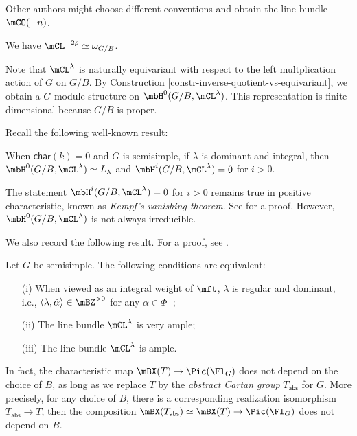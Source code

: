 	\begin{warn}
		Other authors might choose different conventions and obtain the line bundle $\mCO(-n)$.
	\end{warn}

	\begin{exam}
		We have $\mCL^{-2\rho} \simeq \omega_{G/B}$.
	\end{exam}

	\begin{constr}
		Note that $\mCL^\lambda$ is naturally equivariant with respect to the left multplication action of $G$ on $G/B$. By Construction \ref{constr-inverse-quotient-vs-equivariant}, we obtain a $G$-module structure on $\mbH^0(G/B,\mCL^\lambda)$. This representation is finite-dimensional because $G/B$ is proper.
	\end{constr}

	Recall the following well-known result:

	\begin{thm}
		When $\mathsf{char}(k)=0$ and $G$ is semisimple, if $\lambda$ is dominant and integral, then $\mbH^0(G/B,\mCL^\lambda) \simeq L_\lambda$ and $\mbH^i(G/B,\mCL^\lambda)=0$ for $i>0$.
	\end{thm}

	\begin{rem}
		The statement $\mbH^i(G/B,\mCL^\lambda)=0$ for $i>0$ remains true in positive characteristic, known as \emph{Kempf's vanishing theorem}. See \cite[Chapter 4]{J} for a proof. However, $\mbH^0(G/B,\mCL^\lambda)$ is not always irreducible.
	\end{rem}

	We also record the following result. For a proof, see \cite[Chapter 4]{J}.

	\begin{thm}
		Let $G$ be semisimple. The following conditions are equivalent:
		\begin{itemize}
			\item[(i)]
				When viewed as an integral weight of $\mft$, $\lambda$ is regular and dominant, i.e., $\langle \lambda,\check \alpha \rangle \in \mBZ^{>0}$ for any $\alpha\in \Phi^+$;
			\item[(ii)]
				The line bundle $\mCL^\lambda$ is very ample;
			\item[(iii)]
				The line bundle $\mCL^\lambda$ is ample.
		\end{itemize}
	\end{thm}

	\begin{rem}
		In fact, the characteristic map $\mBX(T) \to \Pic(\Fl_G)$ does not depend on the choice of $B$, as long as we replace $T$ by the \emph{abstract Cartan group} $T_{\mathsf{abs}}$ for $G$. More precisely, for any choice of $B$, there is a corresponding realization isomorphism $T_{\mathsf{abs}} \to T$, then the composition $\mBX(T_{\mathsf{abs}}) \simeq \mBX(T)\to \Pic(\Fl_G)$ does not depend on $B$.
	\end{rem}


